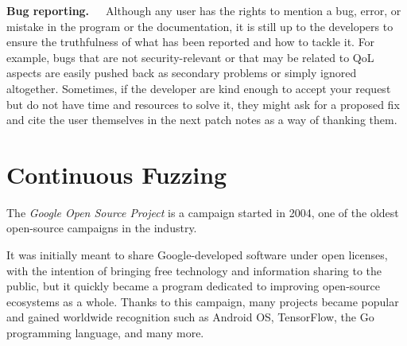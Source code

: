 \textbf{Bug reporting.}\ \ \ Although any user has the rights to mention a bug, error, or mistake in the program or the documentation, it is still up to the developers to ensure the truthfulness of what has been reported and how to tackle it. For example, bugs that are not security-relevant or that may be related to QoL aspects are easily pushed back as secondary problems or simply ignored altogether. Sometimes, if the developer are kind enough to accept your request but do not have time and resources to solve it, they might ask for a proposed fix and cite the user themselves in the next patch notes as a way of thanking them.



\newpage
\section{Continuous Fuzzing}

The \textit{Google Open Source Project} \cite{google_oss} is a campaign started in 2004, one of the oldest open-source campaigns in the industry. 

It was initially meant to share Google-developed software under open licenses, with the intention of bringing free technology and information sharing to the public, but it quickly became a program dedicated to improving open-source ecosystems as a whole. 
Thanks to this campaign, many projects became popular and gained worldwide recognition such as Android OS, TensorFlow, the Go programming language, and many more.


